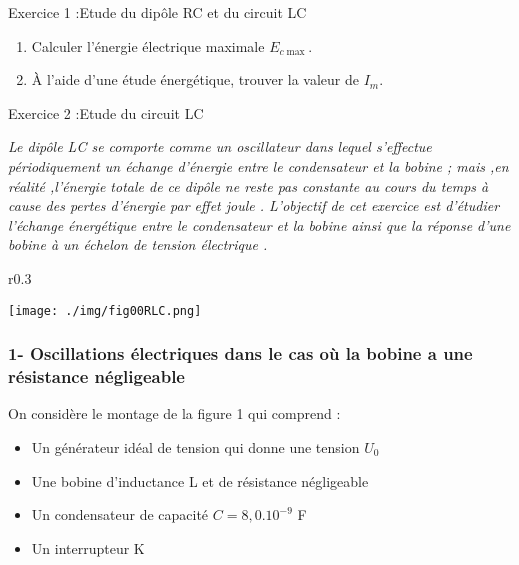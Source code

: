 \documentclass[12pt, french]{article}
\begin{document}
\begin{Box2}{Exercice 1 :Etude du dipôle RC et du circuit LC}
\begin{enumerate}

    \begin{enumerate}
        \item Calculer l’énergie électrique maximale $E_{c\max}$.
        \item À l’aide d’une étude énergétique, trouver la valeur de $I_m$.
    \end{enumerate}
\end{enumerate}
\end{Box2}


\begin{Box2}{Exercice 2 :Etude du circuit LC}


  \emph{Le dipôle LC se comporte comme un oscillateur dans lequel s’effectue périodiquement un échange d’énergie
entre le condensateur et la bobine ; mais ,en réalité ,l’énergie totale de ce dipôle ne reste
pas constante au cours du temps à cause des pertes d’énergie par effet joule .
L’objectif de cet exercice est d’étudier l’échange énergétique entre le condensateur et la bobine ainsi que la
réponse d’une bobine à un échelon de tension électrique .}

  \begin{wrapfigure}[0]{r}{0.3\textwidth}
  \vspace{-0.5cm}
  \begin{center}
    \texttt{[image: ./img/fig00RLC.png]}
  \end{center}
\end{wrapfigure}

\subsubsection*{1- Oscillations électriques dans le cas où la bobine a une résistance négligeable}
On considère le montage de la figure 1 qui comprend :
\begin{itemize}
    \item Un générateur idéal de tension qui donne une tension $U_0$
    \item Une bobine d'inductance L et de résistance négligeable
    \item Un condensateur de capacité $C = 8,0.10^{-9}$ F
    \item Un interrupteur K
\end{itemize}


\end{Box2}
\end{document}
